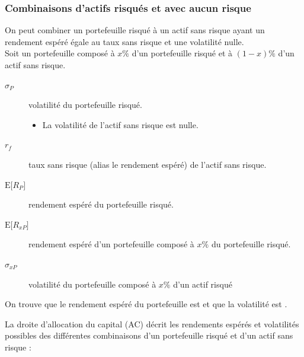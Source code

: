 \documentclass[10pt, french]{article}
\begin{document}
\begin{multicols*}{2}
\columnbreak
\subsubsection{Combinaisons d'actifs risqués et avec aucun risque}
On peut combiner un portefeuille risqué à un actif sans risque ayant un rendement espéré égale au taux sans risque et une volatilité nulle.\\

Soit un portefeuille composé à $x\%$ d'un portefeuille risqué et à $(1 - x)\%$ d'un actif sans risque.
\begin{distributions}[Notation]
\begin{description}
	\item[$\sigma_{P}$]	volatilité du portefeuille risqué.
		\begin{itemize}
		\item	La volatilité de l'actif sans risque est nulle.
		\end{itemize}
	\item[$r_{f}$]	taux sans risque (alias le rendement espéré) de l'actif sans risque.
	\item[$\text{E}\lbrack R_{P}\rbrack$]	rendement espéré du portefeuille risqué.
	\item[$\text{E}\lbrack R_{xP}\rbrack$]	rendement espéré d'un portefeuille composé à $x\%$ du portefeuille risqué.
	\item[$\sigma_{xP}$]	volatilité du portefeuille composé à $x\%$ d'un actif risqué
\end{description}
\end{distributions}

On trouve que le rendement espéré du portefeuille est  et que la volatilité est . 

\begin{definitionNOHFILL}
La droite d'allocation du capital (AC) décrit les rendements espérés et volatilités possibles des différentes combinaisons d'un portefeuille risqué et d'un actif sans risque :
\begin{center}


\end{center}
\end{definitionNOHFILL}
\end{multicols*}
\end{document}

